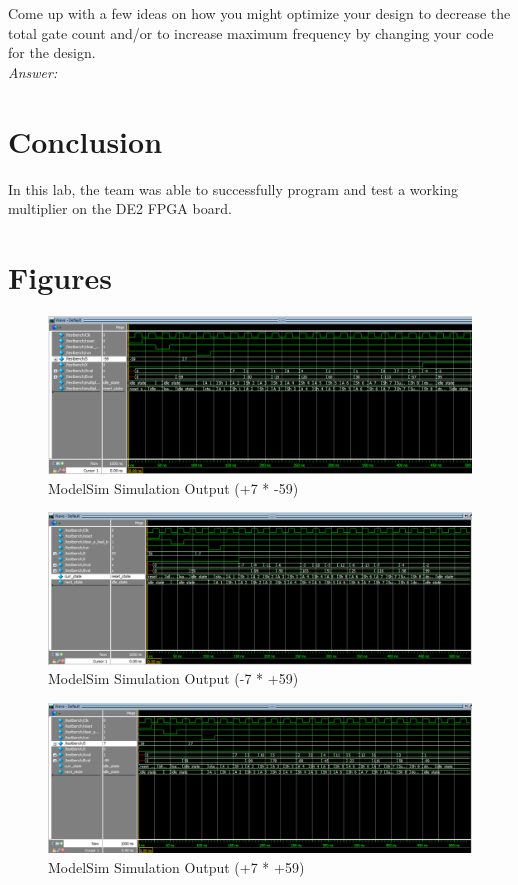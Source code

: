 \documentclass[journal, twocolumn, final,11pt,letterpaper]{IEEEtran}
\begin{document}
Come up with a few ideas on how you might optimize your design to decrease the total gate count and/or to increase maximum frequency by changing your code for the design.\\

\textit{Answer:} 

\section{Conclusion}
In this lab, the team was able to successfully program and test a working multiplier on the DE2 FPGA board.  

\clearpage
\onecolumn
\section{Figures}

\begin{figure} [htbp]
	\centering
	\includegraphics[scale=0.4]{simulation1.png}
	\caption{ModelSim Simulation Output (+7 * -59)\label{fig:simulation1}}
\end{figure}

\begin{figure} [htbp]
	\centering
	\includegraphics[scale=0.4]{simulation2.png}
	\caption{ModelSim Simulation Output (-7 * +59)\label{fig:simulation2t}}
\end{figure}

\begin{figure} [htbp]
	\centering
	\includegraphics[scale=0.4]{simulation3.png}
	\caption{ModelSim Simulation Output (+7 * +59)\label{fig:simulation3}}
\end{figure}
\end{document}
